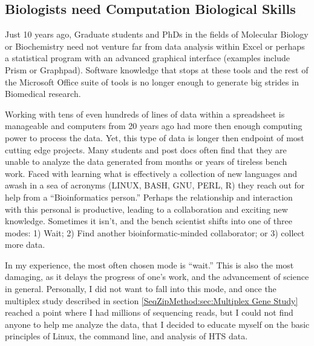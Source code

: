 
  \subsection{Biologists need Computation Biological Skills}
    \label{Disc:subsec:Biologists need Comp Skills}

    Just 10 years ago, Graduate students and PhDs in the fields of Molecular Biology or Biochemistry need not venture far from data analysis within Excel or perhaps a statistical program with an advanced graphical interface (examples include Prism or Graphpad). Software knowledge that stops at these tools and the rest of the Microsoft Office suite of tools is no longer enough to generate big strides in Biomedical research.

    Working with tens of even hundreds of lines of data within a spreadsheet is manageable and computers from 20 years ago had more then enough computing power to process the data. Yet, this type of data is longer then endpoint of most cutting edge projects. Many students and post docs often find that they are unable to analyze the data generated from months or years of tireless bench work. Faced with learning what is effectively a collection of new languages and awash in a sea of acronyms (LINUX, BASH, GNU, PERL, R) they reach out for help from a ``Bioinformatics person.'' Perhaps the relationship and interaction with this personal is productive, leading to a collaboration and exciting new knowledge. Sometimes it isn't, and the bench scientist shifts into one of three modes: 1) Wait; 2) Find another bioinformatic-minded collaborator; or 3) collect more data.


    In my experience, the most often chosen mode is ``wait.'' This is also the most damaging, as it delays the progress of one's work, and the advancement of science in general. Personally, I did not want to fall into this mode, and once the multiplex study described in section \ref{SeqZipMethod:sec:Multiplex Gene Study} reached a point where I had millions of sequencing reads, but I could not find anyone to help me analyze the data, that I decided to educate myself on the basic principles of Linux, the command line, and analysis of HTS data.

